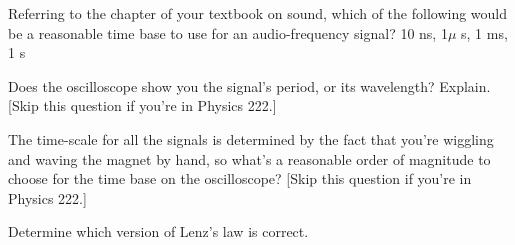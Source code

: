 \prelabquestion  Referring to the chapter of your textbook on sound,
which of the following would be a reasonable time base to
use for an audio-frequency signal? 10 ns, 1$\mu$ s, 1 ms, 1 s

\prelabquestion  Does the oscilloscope show you the signal's period,
or its wavelength? Explain. [Skip this question if you're in Physics 222.]

\prelabquestion The time-scale for all the signals is determined
by the fact that you're wiggling and waving the magnet by hand,
so what's a reasonable order of magnitude to choose for the
time base on the oscilloscope? [Skip this question if you're in Physics 222.]

\selfcheck

Determine which version of Lenz's law is correct.
